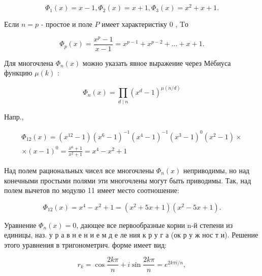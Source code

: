 \documentclass[10pt]{article}
\begin{document}
\[

\Phi_{1}(x)=x-1, \Phi_{2}(x)=x+1, \Phi_{3}(x)=x^{2}+x+1 .

\]



Если $n=p$ - простое и поле $P$ имеет характеристіку 0 , Tо



\[

\Phi_{p}(x)=\frac{x^{p}-1}{x-1}=x^{p-1}+x^{p-2}+\ldots+x+1 .

\]



Для многочлена $\Phi_{n}(x)$ можно указать явное выражение через Мёбиуса функцию $\mu(k)$ :



\[

\Phi_{n}(x)=\prod_{d \mid n}\left(x^{d}-1\right)^{\mu(n / d)}

\]



Напр.,



\[

\begin{gathered}

\Phi_{12}(x)=\left(x^{12}-1\right)\left(x^{6}-1\right)^{-1}\left(x^{4}-1\right)^{-1}\left(x^{3}-1\right)^{0}\left(x^{2}-1\right) \times \\

\times(x-1)^{0}=\frac{x^{6}+1}{x^{2}+1}=x^{4}-x^{2}+1

\end{gathered}

\]



Над полем рациональных чисел все многочлены $\Phi_{n}(x)$ неприводимы, но над конечными простыми полями эти многочлены могут быть приводимы. Так, над полем вычетов по модулю 11 имеет место соотношение:



\[

\Phi_{12}(x)=x^{4}-x^{2}+1=\left(x^{2}+5 x+1\right)\left(x^{2}-5 x+1\right) .

\]



Уравнение $\Phi_{n}(x)=0$, дающее все первообразные корни n-й степени из единицы, наз. у р а в н е н и е м д е ле ния к р у г а (ок р у ж нос т и). Решение этого уравнения в тригонометрич. форме имеет вид:



\[

r_{k}=\cos \frac{2 k \pi}{n}+i \sin \frac{2 k \pi}{n}=e^{2 k \pi i / n},

\]
\end{document}
